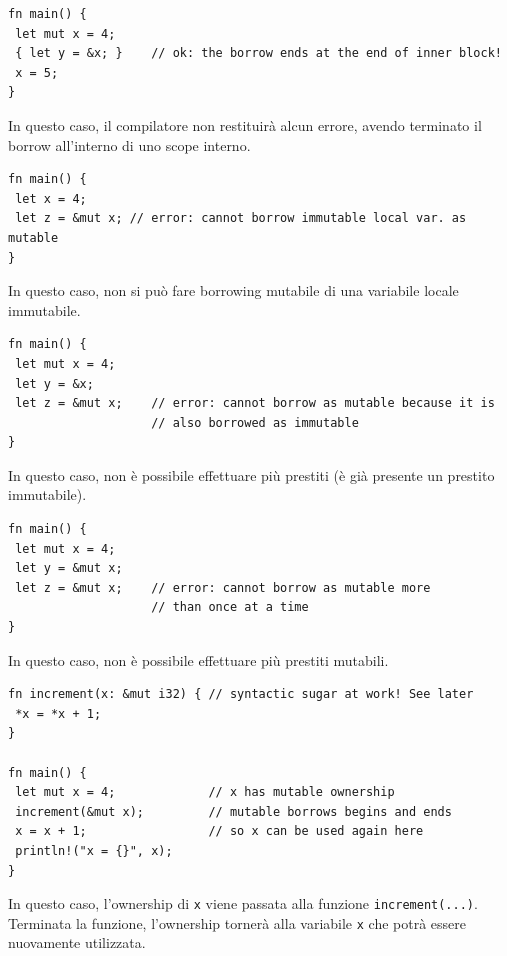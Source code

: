 \documentclass{article}
\begin{document}
\begin{tcolorbox}
\begin{verbatim}
fn main() {
 let mut x = 4;
 { let y = &x; }    // ok: the borrow ends at the end of inner block!
 x = 5;
}
\end{verbatim}
\end{tcolorbox}
In questo caso, il compilatore non restituirà alcun errore, avendo terminato il borrow all'interno di uno scope interno.\vspace{8pt}

\begin{tcolorbox}
\begin{verbatim}
fn main() {
 let x = 4;
 let z = &mut x; // error: cannot borrow immutable local var. as mutable
}
\end{verbatim}
\end{tcolorbox}
In questo caso, non si può fare borrowing mutabile di una variabile locale immutabile.

\pagebreak

\begin{tcolorbox}
\begin{verbatim}
fn main() {
 let mut x = 4;
 let y = &x;
 let z = &mut x;    // error: cannot borrow as mutable because it is 
                    // also borrowed as immutable
}
\end{verbatim}
\end{tcolorbox}
In questo caso, non è possibile effettuare più prestiti (è già presente un prestito immutabile).\vspace{8pt}

\begin{tcolorbox}
\begin{verbatim}
fn main() {
 let mut x = 4;
 let y = &mut x;
 let z = &mut x;    // error: cannot borrow as mutable more 
                    // than once at a time
}
\end{verbatim}
\end{tcolorbox}
In questo caso, non è possibile effettuare più prestiti mutabili.\vspace{8pt}

\begin{tcolorbox}
\begin{verbatim}
fn increment(x: &mut i32) { // syntactic sugar at work! See later
 *x = *x + 1;
}

fn main() {
 let mut x = 4;             // x has mutable ownership
 increment(&mut x);         // mutable borrows begins and ends
 x = x + 1;                 // so x can be used again here
 println!("x = {}", x);
}
\end{verbatim}
\end{tcolorbox}
In questo caso, l'ownership di \texttt{x} viene passata alla funzione \texttt{increment(...)}. Terminata la funzione, l'ownership tornerà alla variabile \texttt{x} che potrà essere nuovamente utilizzata.\vspace{8pt}
\end{document}
